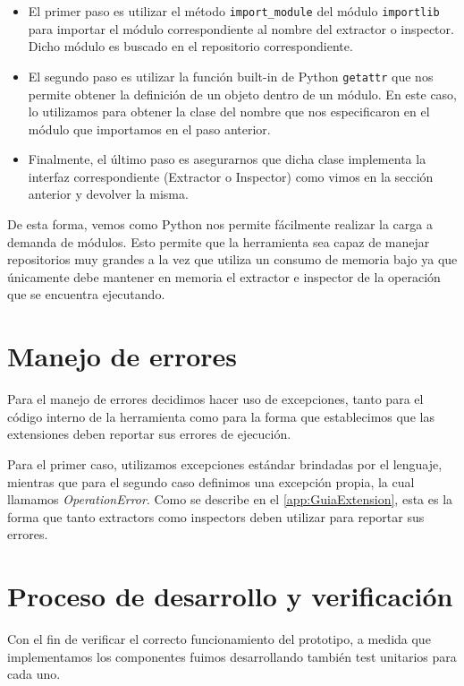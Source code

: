 \begin{itemize}
\item El primer paso es utilizar el método \texttt{import\_module} del módulo \texttt{importlib} \cite{python-importlib} para importar el módulo correspondiente al nombre del extractor o inspector. Dicho módulo es buscado en el repositorio correspondiente.
\item El segundo paso es utilizar la función built-in de Python \texttt{getattr} que nos permite obtener la definición de un objeto dentro de un módulo. En este caso, lo utilizamos para obtener la clase del nombre que nos especificaron en el módulo que importamos en el paso anterior.
\item Finalmente, el último paso es asegurarnos que dicha clase implementa la interfaz correspondiente (Extractor o Inspector) como vimos en la sección anterior y devolver la misma.
\end{itemize}

De esta forma, vemos como Python nos permite fácilmente realizar la carga a demanda de módulos. Esto permite que la herramienta sea capaz de manejar repositorios muy grandes a la vez que utiliza un consumo de memoria bajo ya que únicamente debe mantener en memoria el extractor e inspector de la operación que se encuentra ejecutando.

\section{Manejo de errores}
Para el manejo de errores decidimos hacer uso de excepciones, tanto para el código interno de la herramienta como para la forma que establecimos que las extensiones deben reportar sus errores de ejecución.

Para el primer caso, utilizamos excepciones estándar brindadas por el lenguaje, mientras que para el segundo caso definimos una excepción propia, la cual llamamos \emph{OperationError}. Como se describe en el \autoref{app:GuiaExtension}, esta es la forma que tanto extractors como inspectors deben utilizar para reportar sus errores.

\section{Proceso de desarrollo y verificación} \label{procesoDesarrollo}
Con el fin de verificar el correcto funcionamiento del prototipo, a medida que implementamos los componentes fuimos desarrollando también test unitarios para cada uno.

